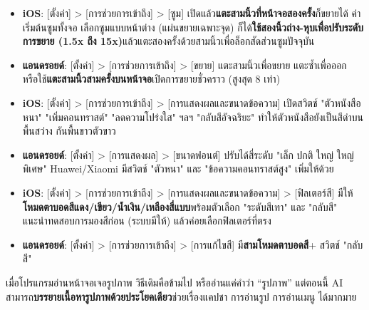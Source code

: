 

\begin{itemize}
  \item \textbf{iOS}: [ตั้งค่า] > [การช่วยการเข้าถึง] > [ซูม] เปิดแล้ว\textbf{แตะสามนิ้วที่หน้าจอสองครั้ง}ก็ขยายได้ ค่าเริ่มต้นซูมทั้งจอ เลือกซูมแบบหน้าต่าง (แผ่นขยายเฉพาะจุด) ก็ได้\textbf{ใช้สองนิ้วถ่าง-หุบเพื่อปรับระดับการขยาย (1.5x ถึง 15x)}แล้วแตะสองครั้งด้วยสามนิ้วเพื่อล็อกสัดส่วนซูมปัจจุบัน
  \item \textbf{แอนดรอยด์}: [ตั้งค่า] > [การช่วยการเข้าถึง] > [ขยาย] แตะสามนิ้วเพื่อขยาย แตะซ้ำเพื่อออก หรือใช้\textbf{แตะสามนิ้วสามครั้งบนหน้าจอ}เปิดการขยายชั่วคราว (สูงสุด 8 เท่า)
\end{itemize}


\begin{itemize}
  \item \textbf{iOS}: [ตั้งค่า] > [การช่วยการเข้าถึง] > [การแสดงผลและขนาดข้อความ] เปิดสวิตช์ "ตัวหนังสือหนา" "เพิ่มคอนทราสต์" "ลดความโปร่งใส" ฯลฯ "กลับสีอัจฉริยะ" ทำให้ตัวหนังสือยังเป็นสีดำบนพื้นสว่าง กันพื้นขาวตัวขาว
  \item \textbf{แอนดรอยด์}: [ตั้งค่า] > [การแสดงผล] > [ขนาดฟอนต์] ปรับได้สี่ระดับ "เล็ก ปกติ ใหญ่ ใหญ่พิเศษ" Huawei/Xiaomi มีสวิตช์ "ตัวหนา" และ "ข้อความคอนทราสต์สูง" เพิ่มให้ด้วย
\end{itemize}


\begin{itemize}
  \item \textbf{iOS}: [ตั้งค่า] > [การช่วยการเข้าถึง] > [การแสดงผลและขนาดข้อความ] > [ฟิลเตอร์สี] มีให้\textbf{โหมดตาบอดสีแดง/เขียว/น้ำเงิน/เหลืองสี่แบบ}พร้อมตัวเลือก "ระดับสีเทา" และ "กลับสี" แนะนำทดสอบการมองสีก่อน (ระบบมีให้) แล้วค่อยเลือกฟิลเตอร์ที่ตรง
  \item \textbf{แอนดรอยด์}: [ตั้งค่า] > [การช่วยการเข้าถึง] > [การแก้ไขสี] มี\textbf{สามโหมดตาบอดสี}+ สวิตช์ "กลับสี"
\end{itemize}


เมื่อโปรแกรมอ่านหน้าจอเจอรูปภาพ วิธีเดิมคือข้ามไป หรืออ่านแค่คำว่า “รูปภาพ” แต่ตอนนี้ AI สามารถ\textbf{บรรยายเนื้อหารูปภาพด้วยประโยคเดียว}ช่วยเรื่องแคปชา การอ่านรูป การอ่านเมนู ได้มากมาย

